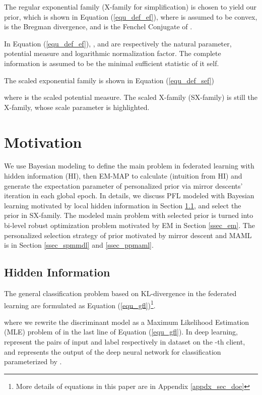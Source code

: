 \documentclass{article}
\begin{document}
The regular exponential family \cite{banerjee2005clustering} (X-family for simplification) is chosen to yield our prior, which is shown in Equation (\ref{equ_def_ef}), where  is assumed to be convex,  is the Bregman divergence, and  is the Fenchel Conjugate of .

In Equation (\ref{equ_def_ef}), ,  and  are respectively the natural parameter, potential measure and logarithmic normalization factor. The complete information  is assumed to be the minimal sufficient statistic of it self.

The scaled exponential family is shown in Equation (\ref{equ_def_sef})



where  is the scaled potential measure. The scaled X-family (SX-family) is still the X-family, whose scale parameter  is highlighted.

\section{Motivation}
\label{sec_mot}

 We use Bayesian modeling to define the main problem in federated learning with hidden information (HI), then EM-MAP to calculate (intuition from HI) and generate the expectation parameter of personalized prior via mirror descents’ iteration in each global epoch. In details, we discuss PFL modeled with Bayesian learning motivated by local hidden information in Section \ref{ssec_hi}, and select the prior in SX-family. The modeled main problem with selected prior is turned into bi-level robust optimization problem motivated by EM  in Section \ref{ssec_em}.\cite{ben2009robust} The personalized selection strategy of prior motivated by mirror descent and MAML is in Section \ref{ssec_spmmdl} and \ref{ssec_ppmaml}.

\subsection{Hidden Information}
\label{ssec_hi}

The general classification problem based on KL-divergence in the federated learning are formulated as Equation (\ref{equ_gfl})\footnote{More details of equations in this paper are in Appendix \ref{appdx_sec_doe}}.

where we rewrite the discriminant model as a Maximum Likelihood Estimation (MLE) problem of  in the last line of Equation (\ref{equ_gfl}). In deep learning,  represent the pairs of input and label respectively in dataset  on the -th client, and  represents the output of the deep neural network for classification parameterized by .
\end{document}
